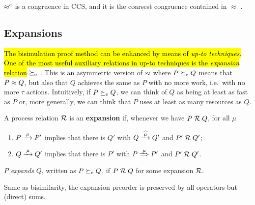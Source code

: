 \begin{theorem}
\label{t:rapproxCongruence}
$\mathrel{\approx^{\rm{c}}}$ is a congruence in CCS, and it is the
coarsest congruence contained in $\approx$ \cite{van2005characterisation}.
\end{theorem}

\subsection{Expansions}
\label{s:expa}

\hl{The bisimulation proof method can be enhanced by means of \emph{up-to
techniques}. One of the most useful auxiliary relations in up-to
techniques is the \emph{expansion} relation} $\mathrel{\succeq_{\rm{e}}}$ \cite{arun1992efficiency,sangiorgi2015equations}.
This is an asymmetric version
of $\approx$ where $P \mathrel{\succeq_{\rm{e}}} Q$ means that $P \approx Q$,
but also that $Q$ achieves the same as $P$
with no more work, i.e.~with no more $\tau$ actions.
Intuitively, if $P \mathrel{\succeq_{\rm{e}}} Q$, we can think of $Q$ as being
at least as fast as $P$
or, more generally, we can think that $P$ uses at least as many resources as $Q$.
\begin{definition}%
\label{d:expa}
A process relation ${{\cal R}}$
  is an \textbf{expansion} if, whenever
we have $P\mathrel{\cal R} Q$, for all $\mu$
 \begin{enumerate}
 \item   $P \arr\mu P'$ implies that there is $Q'$ with $Q \arcap \mu
   Q'$
  and $P' \mathrel{\cal R} Q'$;
 \item
     $Q \arr\mu Q'$   implies that there is $P'$ with $P \Arr \mu
  P'$ and $P'
 \mathrel{\cal R} Q'$.
 \end{enumerate}
  $P$  {\em expands} $Q$, written as
 $P  \mathrel{\succeq_{\rm{e}}} Q$,
 if $P \mathrel{\cal R} Q$ for some expansion ${\cal R}$.
 \end{definition}

Same as bisimilarity, the expansion preorder is preserved by all operators but (direct) sums.

